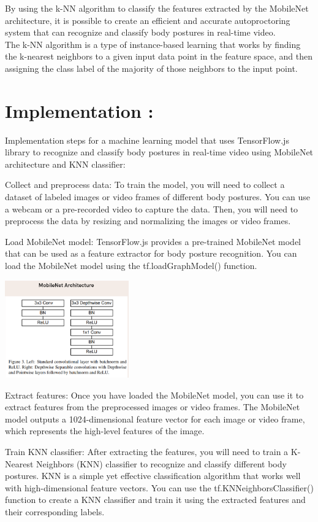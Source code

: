 \documentclass[journal]{IEEEtran}
\begin{document}
By using the k-NN algorithm to classify the features extracted by the MobileNet architecture, it is possible to create an efficient and accurate autoproctoring system that can recognize and classify body postures in real-time video.\\

The k-NN algorithm is a type of instance-based learning that works by finding the k-nearest neighbors to a given input data point in the feature space, and then assigning the class label of the majority of those neighbors to the input point.

\section{Implementation : }
Implementation steps for a machine learning model that uses TensorFlow.js library to recognize and classify body postures in real-time video using MobileNet architecture and KNN classifier:

Collect and preprocess data: To train the model, you will need to collect a dataset of labeled images or video frames of different body postures. You can use a webcam or a pre-recorded video to capture the data. Then, you will need to preprocess the data by resizing and normalizing the images or video frames.

Load MobileNet model: TensorFlow.js provides a pre-trained MobileNet model that can be used as a feature extractor for body posture recognition. You can load the MobileNet model using the tf.loadGraphModel() function. 

\includegraphics[width=0.4\textwidth]{img1.png}





Extract features: Once you have loaded the MobileNet model, you can use it to extract features from the preprocessed images or video frames. The MobileNet model outputs a 1024-dimensional feature vector for each image or video frame, which represents the high-level features of the image.

Train KNN classifier: After extracting the features, you will need to train a K-Nearest Neighbors (KNN) classifier to recognize and classify different body postures. KNN is a simple yet effective classification algorithm that works well with high-dimensional feature vectors. You can use the tf.KNNeighborsClassifier() function to create a KNN classifier and train it using the extracted features and their corresponding labels.
\end{document}
